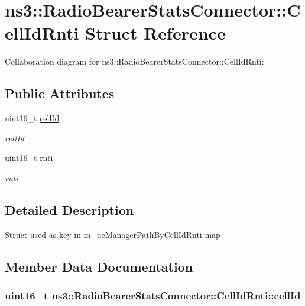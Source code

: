 \hypertarget{structns3_1_1RadioBearerStatsConnector_1_1CellIdRnti}{}\section{ns3\+:\+:Radio\+Bearer\+Stats\+Connector\+:\+:Cell\+Id\+Rnti Struct Reference}
\label{structns3_1_1RadioBearerStatsConnector_1_1CellIdRnti}


Collaboration diagram for ns3\+:\+:Radio\+Bearer\+Stats\+Connector\+:\+:Cell\+Id\+Rnti\+:
\subsection*{Public Attributes}
\begin{DoxyCompactItemize}
\item 
uint16\+\_\+t \hyperlink{structns3_1_1RadioBearerStatsConnector_1_1CellIdRnti_ae14f40a75cef158f688576af7f9b6f3f}{cell\+Id}
\begin{DoxyCompactList}\small\item\em cell\+Id \end{DoxyCompactList}\item 
uint16\+\_\+t \hyperlink{structns3_1_1RadioBearerStatsConnector_1_1CellIdRnti_a9103323d3fcfff3233c0ca3c359e763b}{rnti}
\begin{DoxyCompactList}\small\item\em rnti \end{DoxyCompactList}\end{DoxyCompactItemize}


\subsection{Detailed Description}
Struct used as key in m\+\_\+ue\+Manager\+Path\+By\+Cell\+Id\+Rnti map 

\subsection{Member Data Documentation}
\subsubsection[{\texorpdfstring{cell\+Id}{cellId}}]{\setlength{\rightskip}{0pt plus 5cm}uint16\+\_\+t ns3\+::\+Radio\+Bearer\+Stats\+Connector\+::\+Cell\+Id\+Rnti\+::cell\+Id}\hypertarget{structns3_1_1RadioBearerStatsConnector_1_1CellIdRnti_ae14f40a75cef158f688576af7f9b6f3f}{}\label{structns3_1_1RadioBearerStatsConnector_1_1CellIdRnti_ae14f40a75cef158f688576af7f9b6f3f}


